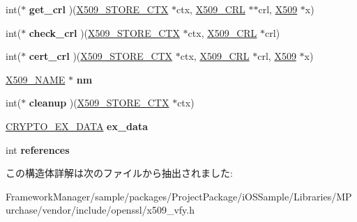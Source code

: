 \begin{DoxyCompactItemize}
\item 
\hypertarget{structx509__store__st_a805b166e3886e35dac65014a43752c17}{}int($\ast$ {\bfseries get\+\_\+crl} )(\hyperlink{structx509__store__ctx__st}{X509\+\_\+\+S\+T\+O\+R\+E\+\_\+\+C\+T\+X} $\ast$ctx, \hyperlink{struct_x509__crl__st}{X509\+\_\+\+C\+R\+L} $\ast$$\ast$crl, \hyperlink{structx509__st}{X509} $\ast$x)\label{structx509__store__st_a805b166e3886e35dac65014a43752c17}

\item 
\hypertarget{structx509__store__st_a7aac41f5042c0d73d994d554dc80bab4}{}int($\ast$ {\bfseries check\+\_\+crl} )(\hyperlink{structx509__store__ctx__st}{X509\+\_\+\+S\+T\+O\+R\+E\+\_\+\+C\+T\+X} $\ast$ctx, \hyperlink{struct_x509__crl__st}{X509\+\_\+\+C\+R\+L} $\ast$crl)\label{structx509__store__st_a7aac41f5042c0d73d994d554dc80bab4}

\item 
\hypertarget{structx509__store__st_a9e4cbd526c96a9d6eca4b05026e3848f}{}int($\ast$ {\bfseries cert\+\_\+crl} )(\hyperlink{structx509__store__ctx__st}{X509\+\_\+\+S\+T\+O\+R\+E\+\_\+\+C\+T\+X} $\ast$ctx, \hyperlink{struct_x509__crl__st}{X509\+\_\+\+C\+R\+L} $\ast$crl, \hyperlink{structx509__st}{X509} $\ast$x)\label{structx509__store__st_a9e4cbd526c96a9d6eca4b05026e3848f}

\item 
\hypertarget{structx509__store__st_a15c220dcc8bf593c683cec71425a5519}{}\hyperlink{struct_x509__name__st}{X509\+\_\+\+N\+A\+M\+E} $\ast$ {\bfseries nm}\label{structx509__store__st_a15c220dcc8bf593c683cec71425a5519}

\item 
\hypertarget{structx509__store__st_a47f8b84ffcf429407df15bf5b896f29a}{}int($\ast$ {\bfseries cleanup} )(\hyperlink{structx509__store__ctx__st}{X509\+\_\+\+S\+T\+O\+R\+E\+\_\+\+C\+T\+X} $\ast$ctx)\label{structx509__store__st_a47f8b84ffcf429407df15bf5b896f29a}

\item 
\hypertarget{structx509__store__st_acb8c355184a6de1d30c4a2cee60f0839}{}\hyperlink{structcrypto__ex__data__st}{C\+R\+Y\+P\+T\+O\+\_\+\+E\+X\+\_\+\+D\+A\+T\+A} {\bfseries ex\+\_\+data}\label{structx509__store__st_acb8c355184a6de1d30c4a2cee60f0839}

\item 
\hypertarget{structx509__store__st_a2ecec6a415050f38b3d260c258f4f913}{}int {\bfseries references}\label{structx509__store__st_a2ecec6a415050f38b3d260c258f4f913}

\end{DoxyCompactItemize}


この構造体詳解は次のファイルから抽出されました\+:\begin{DoxyCompactItemize}
\item 
Framework\+Manager/sample/packages/\+Project\+Package/i\+O\+S\+Sample/\+Libraries/\+M\+Purchase/vendor/include/openssl/x509\+\_\+vfy.\+h\end{DoxyCompactItemize}
